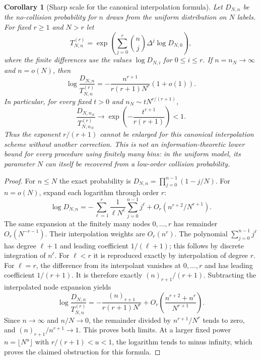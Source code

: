 \documentclass[11pt]{article}
\newtheorem{corollary}[theorem]{Corollary}
\theoremstyle{definition}
\begin{document}
\begin{corollary}[Sharp scale for the canonical interpolation formula]
\label{cor:uniform-collision-interpolation-sharpness}
Let $D_{N,n}$ be the no-collision probability for $n$ draws
from the uniform distribution on $N$ labels.
For fixed $r\ge1$ and $N>r$ let
\[
 T^{(r)}_{N,n}
       =\exp\left(\sum_{j=0}^r{n\choose j}
                          \Delta^j\log D_{N,0}\right),
\]
where the finite differences use the values
$\log D_{N,i}$ for $0\le i\le r$.
If $n=n_N\to\infty$ and $n=o(N)$, then
\begin{equation}
 \log\frac{D_{N,n}}{T^{(r)}_{N,n}}
       =-\frac{n^{r+1}}{r(r+1)N^r}(1+o(1)).
 \label{eq:uniform-hierarchy-sharpness}
\end{equation}
In particular, for every fixed $t>0$ and
$n_N\sim tN^{r/(r+1)}$,
\begin{equation}
 \frac{D_{N,n_N}}{T^{(r)}_{N,n_N}}
       \longrightarrow
        \exp\left(-\frac{t^{r+1}}{r(r+1)}\right)<1.
 \label{eq:uniform-hierarchy-critical-limit}
\end{equation}
Thus the exponent $r/(r+1)$ cannot be enlarged for this
canonical interpolation scheme without another correction.
This is not an information-theoretic lower bound for every
procedure using finitely many bins: in the uniform model, its
parameter $N$ can itself be recovered from a low-order collision
probability.
\end{corollary}

\begin{proof}
For $n\le N$ the exact probability is
$D_{N,n}=\prod_{j=0}^{n-1}(1-j/N)$.
For $n=o(N)$, expand each logarithm through order $r$:
\[
 \log D_{N,n}
   =-\sum_{\ell=1}^r\frac1{\ell N^\ell}
                    \sum_{j=0}^{n-1}j^\ell
       +O_r(n^{r+2}/N^{r+1}).
\]
The same expansion at the finitely many nodes $0,\ldots,r$
has remainder $O_r(N^{-r-1})$.
Their interpolation weights are $O_r(n^r)$.
The polynomial $\sum_{j=0}^{n-1}j^\ell$ has degree
$\ell+1$ and leading coefficient $1/(\ell+1)$;
this follows by discrete integration of $n^\ell$.
For $\ell<r$ it is reproduced exactly by interpolation of
degree $r$.
For $\ell=r$, the difference from its interpolant vanishes
at $0,\ldots,r$ and has leading coefficient $1/(r+1)$.
It is therefore exactly $(n)_{r+1}/(r+1)$.
Subtracting the interpolated node expansion yields
\[
 \log\frac{D_{N,n}}{T^{(r)}_{N,n}}
   =-\frac{(n)_{r+1}}{r(r+1)N^r}
      +O_r\left(\frac{n^{r+2}+n^r}{N^{r+1}}\right).
\]
Since $n\to\infty$ and $n/N\to0$, the remainder divided by
$n^{r+1}/N^r$ tends to zero, and
$(n)_{r+1}/n^{r+1}\to1$.
This proves both limits.
At a larger fixed power $n=\lfloor N^u\rfloor$ with
$r/(r+1)<u<1$, the logarithm tends to minus infinity,
which proves the claimed obstruction for this formula.
\end{proof}
\end{document}
